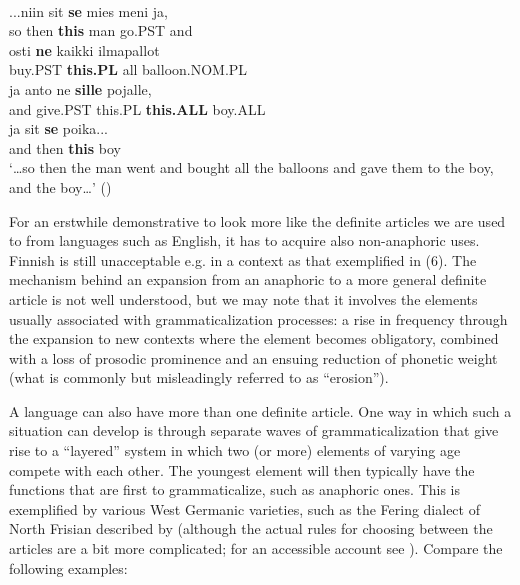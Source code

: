 \ea\label{}
\\
\gll	...niin  sit  \textbf{se} mies  meni  ja,\\
		so  then  \textbf{this} man  go.PST  and\\
\gll	osti  \textbf{ne} kaikki  ilmapallot\\
		buy.PST  \textbf{this.PL} all  balloon.NOM.PL\\
\gll	ja  anto  ne  \textbf{sille} pojalle,\\
		and  give.PST  this.PL  \textbf{this.ALL} boy.ALL\\
		
\gll 	ja  sit  \textbf{se} poika...\\
		and then  \textbf{this} boy\\
\glt 	‘…so then the man went and bought all the balloons and gave them to the boy, and the boy…’ (\citet[136]{Juvonen2000})

\z

For an erstwhile demonstrative to look more like the definite articles we are used to from languages such as English, it has to acquire also non-anaphoric uses. Finnish is still unacceptable e.g. in a context as that exemplified in (6). The mechanism behind an expansion from an anaphoric to a more general definite article is not well understood, but we may note that it involves the elements usually associated with grammaticalization processes: a rise in frequency through the expansion to new contexts where the element becomes obligatory, combined with a loss of prosodic prominence and an ensuing reduction of phonetic weight (what is commonly but misleadingly referred to as “erosion”). 


A language can also have more than one definite article. One way in which such a situation can develop is through separate waves of grammaticalization that give rise to a “layered” system in which two (or more) elements of varying age compete with each other. The youngest element will then typically have the functions that are first to grammaticalize, such as anaphoric ones. This is exemplified by various West Germanic varieties, such as the Fering dialect of North Frisian described by \citet{Ebert1971} (although the actual rules for choosing between the articles are a bit more complicated; for an accessible account see \citet[162]{Lyons1999}). Compare the following examples:

